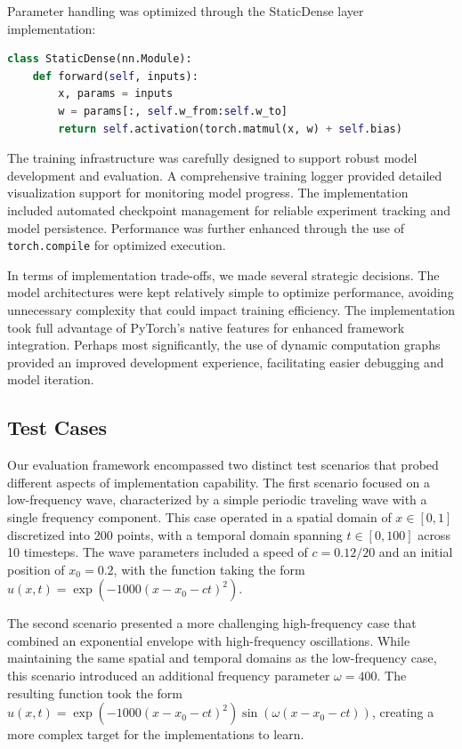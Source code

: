 \documentclass[10pt,journal,compsoc,onecolumn]{IEEEtran}
\begin{document}
Parameter handling was optimized through the StaticDense layer implementation:

\begin{lstlisting}[language=Python, gobble=8]
class StaticDense(nn.Module):
    def forward(self, inputs):
        x, params = inputs
        w = params[:, self.w_from:self.w_to]
        return self.activation(torch.matmul(x, w) + self.bias)
\end{lstlisting}

The training infrastructure was carefully designed to support robust model development and evaluation. A comprehensive training logger provided detailed visualization support for monitoring model progress. The implementation included automated checkpoint management for reliable experiment tracking and model persistence. Performance was further enhanced through the use of \texttt{torch.compile} for optimized execution.

In terms of implementation trade-offs, we made several strategic decisions. The model architectures were kept relatively simple to optimize performance, avoiding unnecessary complexity that could impact training efficiency. The implementation took full advantage of PyTorch's native features for enhanced framework integration. Perhaps most significantly, the use of dynamic computation graphs provided an improved development experience, facilitating easier debugging and model iteration.

\subsection{Test Cases}
Our evaluation framework encompassed two distinct test scenarios that probed different aspects of implementation capability. The first scenario focused on a low-frequency wave, characterized by a simple periodic traveling wave with a single frequency component. This case operated in a spatial domain of $x \in [0,1]$ discretized into 200 points, with a temporal domain spanning $t \in [0,100]$ across 10 timesteps. The wave parameters included a speed of $c = 0.12/20$ and an initial position of $x_0 = 0.2$, with the function taking the form $u(x,t) = \exp(-1000(x-x_0-ct)^2)$.

The second scenario presented a more challenging high-frequency case that combined an exponential envelope with high-frequency oscillations. While maintaining the same spatial and temporal domains as the low-frequency case, this scenario introduced an additional frequency parameter $\omega = 400$. The resulting function took the form $u(x,t) = \exp(-1000(x-x_0-ct)^2)\sin(\omega(x-x_0-ct))$, creating a more complex target for the implementations to learn.
\end{document}
